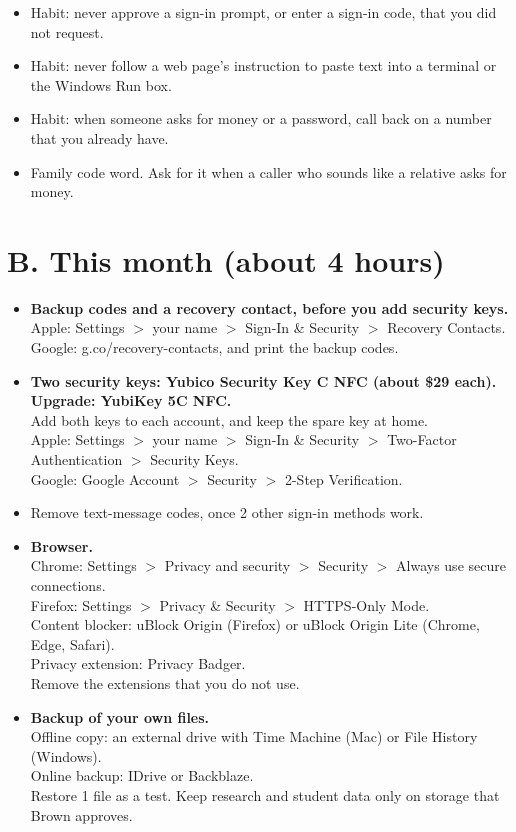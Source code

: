 \documentclass[10pt]{article}
\begin{document}
\begin{itemize}
\item Habit: never approve a sign-in prompt, or enter a sign-in code, that you did not request.
\item Habit: never follow a web page's instruction to paste text into a terminal or the Windows Run box.
\item Habit: when someone asks for money or a password, call back on a number that you already have.
\item Family code word. Ask for it when a caller who sounds like a relative asks for money.
\end{itemize}
\section{B. This month (about 4 hours)}
\begin{itemize}
\item \textbf{Backup codes and a recovery contact, before you add security keys.}\\{\small Apple: Settings $>$ your name $>$ Sign-In \& Security $>$ Recovery Contacts.\\ Google: g.co/recovery-contacts, and print the backup codes.}
\item \textbf{Two security keys: Yubico Security Key C NFC (about \$29 each). Upgrade: YubiKey 5C NFC.}\\{\small Add both keys to each account, and keep the spare key at home.\\ Apple: Settings $>$ your name $>$ Sign-In \& Security $>$ Two-Factor Authentication $>$ Security Keys.\\ Google: Google Account $>$ Security $>$ 2-Step Verification.}
\item Remove text-message codes, once 2 other sign-in methods work.
\item \textbf{Browser.}\\{\small Chrome: Settings $>$ Privacy and security $>$ Security $>$ Always use secure connections.\\ Firefox: Settings $>$ Privacy \& Security $>$ HTTPS-Only Mode.\\ Content blocker: uBlock Origin (Firefox) or uBlock Origin Lite (Chrome, Edge, Safari).\\ Privacy extension: Privacy Badger.\\ Remove the extensions that you do not use.}
\item \textbf{Backup of your own files.}\\{\small Offline copy: an external drive with Time Machine (Mac) or File History (Windows).\\ Online backup: IDrive or Backblaze.\\ Restore 1 file as a test. Keep research and student data only on storage that Brown approves.}

\end{itemize}
\end{document}
